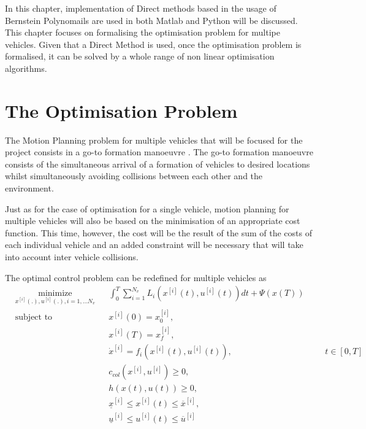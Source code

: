 \cleardoublepage
\label{chap:implementation}

\par In this chapter, implementation of Direct methods based in the usage of Bernstein Polynomails are used in both Matlab and Python will be discussed. This chapter focuses on formalising the optimisation problem for multipe vehicles. Given that a Direct Method is used, once the optimisation problem is formalised, it can be solved by a whole range of non linear optimisation algorithms.

\section{The Optimisation Problem}

\par The Motion Planning problem for multiple vehicles that will be focused for the project consists in a go-to formation manoeuvre \cite{sabetghadam2018cooperative}. The go-to formation manoeuvre consists of the simultaneous arrival of a formation of vehicles to desired locations whilst simultaneously avoiding collisions between each other and the environment.

\par Just as for the case of optimisation for a single vehicle, motion planning for multiple vehicles will also be based on the minimisation of an appropriate cost function. This time, however, the cost will be the result of the sum of the costs of each individual vehicle and an added constraint will be necessary that will take into account inter vehicle collisions. 

\par The optimal control problem can be redefined for multiple vehicles as 
\begin{equation}
    \label{eq:multi_cost}
    \begin{aligned}
    & \underset{x^{[i]}(.),u^{[i]}(.),i= 1,\dots N_v}{\text{minimize}} && \int_0^T \sum_{i=1}^{N_v}  L_i (x^{[i]}(t),u^{[i]}(t))dt + \Psi (x(T)) \\
    & \text{subject to}  && x^{[i]}(0) = x_0^{[i]}, \\
        & && x^{[i]}(T) = x_f^{[i]}, \\
        & && \dot{x}^{[i]} = f_i (x^{[i]}(t), u^{[i]}(t)), &&& t \in [0,T]\\
        & && c_{col} (x^{[i]},u^{[i]} ) \geq 0, \\
        & && h(x(t),u(t)) \geq 0, \\
        & && \underline{x}^{[i]} \leq x^{[i]} (t) \leq \overline{x}^{[i]} , \\
        & && \underline{u}^{[i]} \leq u^{[i]} (t) \leq \overline{u}^{[i]}
    \end{aligned}
\end{equation}

